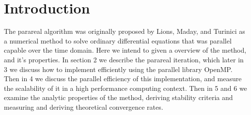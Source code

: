 \section{Introduction}

The parareal algorithm was originally proposed by Lions, Maday, and Turinici
\cite{original} as a numerical method to solve ordinary differential equations
that was parallel capable over the time domain. Here we intend to given a
overview of the method, and it's properties. In section 2 we describe the
parareal iteration, which later in 3 we discuss how to implement efficiently
using the parallel library OpenMP. Then in 4 we discuss the parallel efficiency
of this implementation, and measure the scalability of it in a high performance
computing context. Then in 5 and 6 we examine the analytic properties of the
method, deriving stability criteria and measuring and deriving theoretical
convergence rates.
